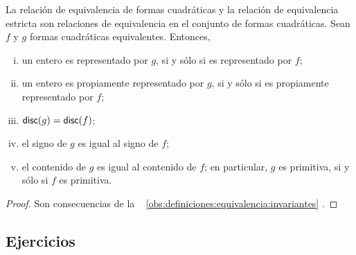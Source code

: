 \begin{teoDefiniciones}\label{teo:definiciones:equivalencia:invariantes}
	La relaci\'on de equivalencia de formas cuadr\'aticas y la
	relaci\'on de equivalencia estricta son relaciones de equivalencia
	en el conjunto de formas cuadr\'aticas.
	Sean $f$ y $g$ formas cuadr\'aticas equivalentes. Entonces,
	\begin{enumerate}[(i)]
		\item\label{item:definiciones:invariantes:representados}
			un entero es representado por $g$, si y s\'olo si
			es representado por $f$;
		\item\label{item:definiciones:invariantes:propiamente}
			un entero es propiamente representado por $g$,
			si y s\'olo si es propiamente representado por $f$;
		\item\label{item:definiciones:invariantes:discriminante}
			$\mathsf{disc}(g)=\mathsf{disc}(f)$;
		\item\label{item:definiciones:invariantes:signo}
			el signo de $g$ es igual al signo de $f$;
		\item\label{item:definiciones:invariantes:contenido}
			el contenido de $g$ es igual al contenido de $f$;
			en particular,
			$g$ es primitiva, si y s\'olo si
			$f$ es primitiva.
	\end{enumerate}
\end{teoDefiniciones}

\begin{proof}
	Son consecuencias de la \obsname~%
	\ref{obs:definiciones:equivalencia:invariantes}
	\quedacomoejercicio.
\end{proof}

\subsection*{Ejercicios}


